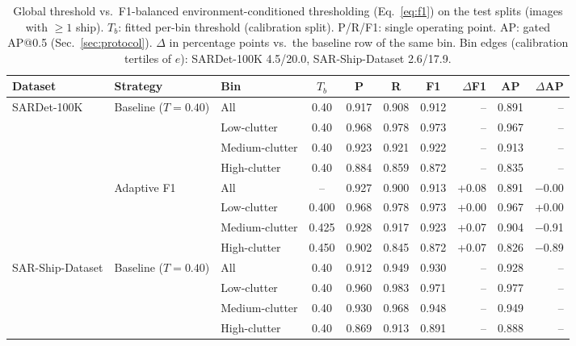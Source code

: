 \documentclass[journal]{IEEEtran}
\begin{document}
\begin{table}[t]
\centering
\caption{Global threshold vs.\ F1-balanced environment-conditioned
thresholding (Eq.~\eqref{eq:f1}) on the test splits (images with $\ge1$
ship). $T_b$: fitted per-bin threshold (calibration split). P/R/F1: single
operating point. AP: gated AP@0.5 (Sec.~\ref{sec:protocol}). $\Delta$ in
percentage points vs.\ the baseline row of the same bin. Bin edges
(calibration tertiles of $e$): SARDet-100K 4.5/20.0, SAR-Ship-Dataset
2.6/17.9.}
\label{tab:main}
\small
\setlength{\tabcolsep}{4pt}
\begin{tabular}{l l l c c c c r c r}
\toprule
Dataset & Strategy & Bin & $T_b$ & P & R & F1 & $\Delta$F1 & AP & $\Delta$AP \\
\midrule
SARDet-100K & Baseline ($T{=}0.40$) & All            & 0.40 & 0.917 & 0.908 & 0.912 &      -- & 0.891 &      -- \\
            &                       & Low-clutter    & 0.40 & 0.968 & 0.978 & 0.973 &      -- & 0.967 &      -- \\
            &                       & Medium-clutter & 0.40 & 0.923 & 0.921 & 0.922 &      -- & 0.913 &      -- \\
            &                       & High-clutter   & 0.40 & 0.884 & 0.859 & 0.872 &      -- & 0.835 &      -- \\
\addlinespace[2pt]
            & Adaptive F1           & All            &    -- & 0.927 & 0.900 & 0.913 &   +0.08 & 0.891 & $-$0.00 \\
            &                       & Low-clutter    & 0.400 & 0.968 & 0.978 & 0.973 &   +0.00 & 0.967 &   +0.00 \\
            &                       & Medium-clutter & 0.425 & 0.928 & 0.917 & 0.923 &   +0.07 & 0.904 & $-$0.91 \\
            &                       & High-clutter   & 0.450 & 0.902 & 0.845 & 0.872 &   +0.07 & 0.826 & $-$0.89 \\
\midrule
SAR-Ship-Dataset & Baseline ($T{=}0.40$) & All        & 0.40 & 0.912 & 0.949 & 0.930 &      -- & 0.928 &      -- \\
            &                       & Low-clutter    & 0.40 & 0.960 & 0.983 & 0.971 &      -- & 0.977 &      -- \\
            &                       & Medium-clutter & 0.40 & 0.930 & 0.968 & 0.948 &      -- & 0.949 &      -- \\
            &                       & High-clutter   & 0.40 & 0.869 & 0.913 & 0.891 &      -- & 0.888 &      -- \\

\end{tabular}
\end{table}
\end{document}
